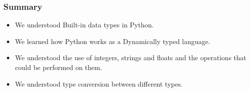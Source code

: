 \documentclass{beamer}
\begin{document}
\begin{frame}
\frametitle{Summary}
\begin{itemize}
\item We understood Built-in data types in Python.
\item We learned how Python works as a Dynamically typed language.
\item We understood the use of integers, strings and floats and the operations that could be performed on them.
\item We understood type conversion between different types.
\end{itemize}
\end{frame}
\end{document}
